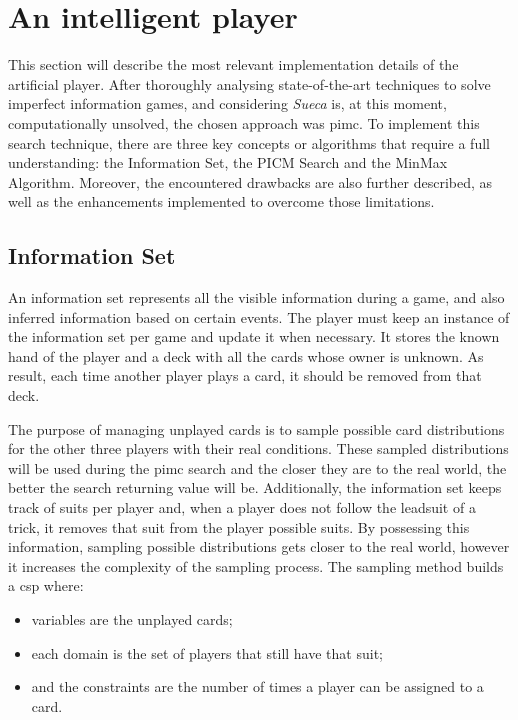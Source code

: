 \section{An intelligent player}%
\label{sec:artificial_player}

This section will describe the most relevant implementation details of the artificial player.
After thoroughly analysing state-of-the-art techniques to solve imperfect information games, and considering \emph{Sueca} is, at this moment, computationally unsolved, the chosen approach was \ac{pimc}.
To implement this search technique, there are three key concepts or algorithms that require a full understanding: the Information Set, the PICM Search and the MinMax Algorithm.
Moreover, the encountered drawbacks are also further described, as well as the enhancements implemented to overcome those limitations.

\subsection*{Information Set}

An information set represents all the visible information during a game, and also inferred information based on certain events.
The player must keep an instance of the information set per game and update it when necessary.
It stores the known hand of the player and a deck with all the cards whose owner is unknown.
As result, each time another player plays a card, it should be removed from that deck.

The purpose of managing unplayed cards is to sample possible card distributions for the other three players with their real conditions.
These sampled distributions will be used during the \ac{pimc} search and the closer they are to the real world, the better the search returning value will be.
Additionally, the information set keeps track of suits per player and, when a player does not follow the leadsuit of a trick, it removes that suit from the player possible suits.
By possessing this information, sampling possible distributions gets closer to the real world, however it increases the complexity of the sampling process.
The sampling method builds a \ac{csp} where:
\begin{itemize}
\item variables are the unplayed cards;
\item each domain is the set of players that still have that suit;
\item and the constraints are the number of times a player can be assigned to a card.
\end{itemize}


